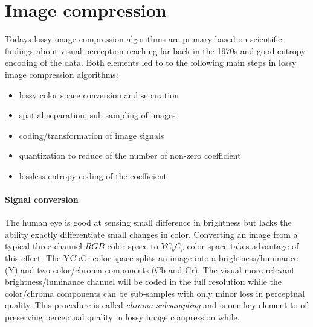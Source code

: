 \section{Image compression}
Todays lossy image compression algorithms are primary based on scientific
findings about visual perception reaching far back in the 1970s\cite{?} and
good entropy encoding of the data. Both elements led to to the
following main steps in lossy image compression algorithms:
\begin{itemize}
 \item lossy color space conversion and separation
 \item spatial separation, sub-sampling of images
 \item coding/transformation of image signals
 \item quantization to reduce of the number of non-zero coefficient 
 \item lossless entropy coding of the coefficient 
\end{itemize}

\paragraph{Signal conversion}
The human eye is good at sensing small difference in brightness but lacks the
ability exactly differentiate small changes in color. Converting an image from a
typical three channel $RGB$ color space to $YC_bC_r$ color space takes advantage
of
this effect. The YCbCr color space splits an image
into a brightness/luminance (Y) and two color/chroma components (Cb
and Cr). The visual more relevant brightness/luminance channel will be coded
in the full resolution while the color/chroma components can be sub-samples
with only minor loss in perceptual quality. This procedure is called
\emph{chroma subsampling} and is one key element to of preserving perceptual
quality in lossy image compression while.

